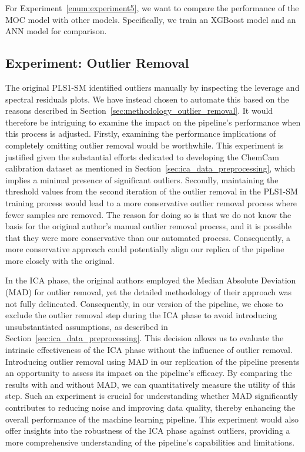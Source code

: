 For Experiment~\ref{enum:experiment5}, we want to compare the performance of the MOC model with other models.
Specifically, we train an XGBoost model and an ANN model for comparison.

\subsection{Experiment: Outlier Removal}\label{sec:experiment_outlier_removal}

The original PLS1-SM identified outliers manually by inspecting the leverage and spectral residuals plots.
We have instead chosen to automate this based on the reasons described in Section~\ref{sec:methodology_outlier_removal}.
It would therefore be intriguing to examine the impact on the pipeline's performance when this process is adjusted.
Firstly, examining the performance implications of completely omitting outlier removal would be worthwhile.
This experiment is justified given the substantial efforts dedicated to developing the ChemCam calibration dataset as mentioned in Section~\ref{sec:ica_data_preprocessing}, which implies a minimal presence of significant outliers.
Secondly, maintaining the threshold values from the second iteration of the outlier removal in the PLS1-SM training process would lead to a more conservative outlier removal process where fewer samples are removed.
The reason for doing so is that we do not know the basis for the original author's manual outlier removal process, and it is possible that they were more conservative than our automated process.
Consequently, a more conservative approach could potentially align our replica of the pipeline more closely with the original.

In the ICA phase, the original authors employed the Median Absolute Deviation (MAD) for outlier removal, yet the detailed methodology of their approach was not fully delineated.
Consequently, in our version of the pipeline, we chose to exclude the outlier removal step during the ICA phase to avoid introducing unsubstantiated assumptions, as described in Section~\ref{sec:ica_data_preprocessing}.
This decision allows us to evaluate the intrinsic effectiveness of the ICA phase without the influence of outlier removal.
Introducing outlier removal using MAD in our replication of the pipeline presents an opportunity to assess its impact on the pipeline's efficacy.
By comparing the results with and without MAD, we can quantitatively measure the utility of this step.
Such an experiment is crucial for understanding whether MAD significantly contributes to reducing noise and improving data quality, thereby enhancing the overall performance of the machine learning pipeline.
This experiment would also offer insights into the robustness of the ICA phase against outliers, providing a more comprehensive understanding of the pipeline's capabilities and limitations.

